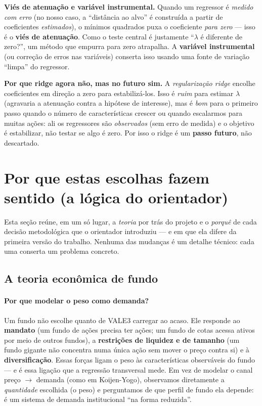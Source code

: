 \documentclass[11pt,a4paper]{article}
\begin{document}
\begin{conceito}
\textbf{Viés de atenuação e variável instrumental.} Quando um regressor é \emph{medido com erro}
(no nosso caso, a ``distância ao alvo'' é construída a partir de coeficientes \emph{estimados}),
o mínimos quadrados puxa o coeficiente \emph{para zero} --- isso é o \textbf{viés de atenuação}.
Como o teste central é justamente ``$\lambda$ é diferente de zero?'', um método que empurra para
zero atrapalha. A \textbf{variável instrumental} (ou correção de erros nas variáveis) conserta
isso usando uma fonte de variação ``limpa'' do regressor.
\end{conceito}

\begin{conceito}
\textbf{Por que ridge agora não, mas no futuro sim.} A \emph{regularização ridge} encolhe
coeficientes em direção a zero para estabilizá-los. Isso é \emph{ruim} para estimar $\lambda$
(agravaria a atenuação contra a hipótese de interesse), mas é \emph{bom} para o primeiro passo
quando o número de características crescer ou quando escalarmos para muitas ações: ali os
regressores são \emph{observados} (sem erro de medida) e o objetivo é estabilizar, não testar se
algo é zero. Por isso o ridge é um \textbf{passo futuro}, não descartado.
\end{conceito}

\section{Por que estas escolhas fazem sentido (a lógica do orientador)}
\label{sec:logica}

Esta seção reúne, em um só lugar, a \emph{teoria} por trás do projeto e o \emph{porquê} de cada
decisão metodológica que o orientador introduziu --- e em que ela difere da primeira versão do
trabalho. Nenhuma das mudanças é um detalhe técnico: cada uma conserta um problema concreto.

\subsection{A teoria econômica de fundo}

\paragraph{Por que modelar o peso como demanda?} Um fundo não escolhe quanto de VALE3 carregar ao
acaso. Ele responde ao \textbf{mandato} (um fundo de ações precisa ter ações; um fundo de cotas
acessa ativos por meio de outros fundos), a \textbf{restrições de liquidez e de tamanho} (um fundo
gigante não concentra numa única ação sem mover o preço contra si) e à \textbf{diversificação}.
Essas forças ligam o peso às características observáveis do fundo --- e é essa ligação que a
regressão transversal mede. Em vez de modelar o canal preço $\to$ demanda (como em Koijen-Yogo),
observamos diretamente a \emph{quantidade} escolhida (o peso) e perguntamos de que perfil de fundo
ela depende: é um sistema de demanda institucional ``na forma reduzida''.
\end{document}

